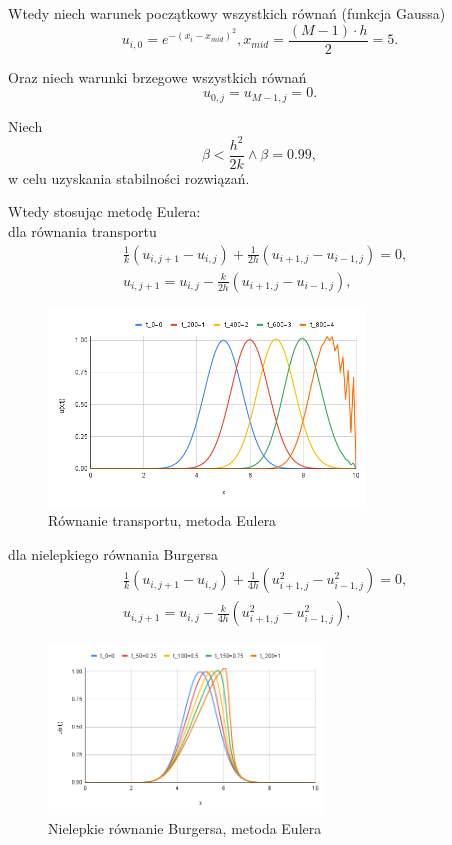 \documentclass[12pt, a4paper]{article}
\begin{document}
Wtedy niech warunek początkowy wszystkich równań (funkcja Gaussa)
\begin{equation}
u_{i,0}=e^{-(x_{i}-x_{mid})^{2}}, x_{mid}=\frac{(M - 1) \cdot h}{2}=5.
\end{equation}

Oraz niech warunki brzegowe wszystkich równań
\begin{equation}
u_{0,j}=u_{M-1,j}=0.
\end{equation}

Niech 
\begin{equation}
\beta<\frac{h^{2}}{2k}\land\beta=0.99,
\end{equation}
w celu uzyskania stabilności rozwiązań.
\newpage

Wtedy stosując metodę Eulera:\\
dla równania transportu
\begin{equation}
\begin{split}
& \frac{1}{k}(u_{i,j+1}-u_{i,j})+\frac{1}{2h}(u_{i+1,j}-u_{i-1,j})=0,\\
& u_{i,j+1}=u_{i,j}-\frac{k}{2h}(u_{i+1,j}-u_{i-1,j}),
\end{split}
\end{equation}
\begin{figure}[h]
\caption{Równanie transportu, metoda Eulera}
\centering
\includegraphics[width=0.75\textwidth]{0.png}
\end{figure}

dla nielepkiego równania Burgersa
\begin{equation}
\begin{split}
& \frac{1}{k}(u_{i,j+1}-u_{i,j})+\frac{1}{4h}(u_{i+1,j}^{2}-u_{i-1,j}^{2})=0,\\
& u_{i,j+1}=u_{i,j}-\frac{k}{4h}(u_{i+1,j}^{2}-u_{i-1,j}^{2}),
\end{split}
\end{equation}
\begin{figure}[h]
\caption{Nielepkie równanie Burgersa, metoda Eulera}
\centering
\includegraphics[width=0.65\textwidth]{1.png}
\end{figure}
\newpage
\end{document}
